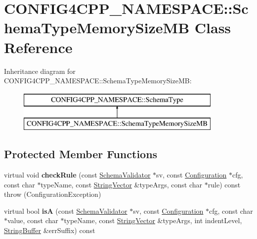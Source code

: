 \hypertarget{classCONFIG4CPP__NAMESPACE_1_1SchemaTypeMemorySizeMB}{\section{C\-O\-N\-F\-I\-G4\-C\-P\-P\-\_\-\-N\-A\-M\-E\-S\-P\-A\-C\-E\-:\-:Schema\-Type\-Memory\-Size\-M\-B Class Reference}
\label{classCONFIG4CPP__NAMESPACE_1_1SchemaTypeMemorySizeMB}
}
Inheritance diagram for C\-O\-N\-F\-I\-G4\-C\-P\-P\-\_\-\-N\-A\-M\-E\-S\-P\-A\-C\-E\-:\-:Schema\-Type\-Memory\-Size\-M\-B\-:\begin{figure}[H]
\begin{center}
\leavevmode
\includegraphics[height=2.000000cm]{classCONFIG4CPP__NAMESPACE_1_1SchemaTypeMemorySizeMB}
\end{center}
\end{figure}
\subsection*{Protected Member Functions}
\begin{DoxyCompactItemize}
\item 
\hypertarget{classCONFIG4CPP__NAMESPACE_1_1SchemaTypeMemorySizeMB_a6f12e23752f296eada46b10ca2ce85d4}{virtual void {\bfseries check\-Rule} (const \hyperlink{classCONFIG4CPP__NAMESPACE_1_1SchemaValidator}{Schema\-Validator} $\ast$sv, const \hyperlink{classCONFIG4CPP__NAMESPACE_1_1Configuration}{Configuration} $\ast$cfg, const char $\ast$type\-Name, const \hyperlink{classCONFIG4CPP__NAMESPACE_1_1StringVector}{String\-Vector} \&type\-Args, const char $\ast$rule) const   throw (\-Configuration\-Exception)}\label{classCONFIG4CPP__NAMESPACE_1_1SchemaTypeMemorySizeMB_a6f12e23752f296eada46b10ca2ce85d4}

\item 
\hypertarget{classCONFIG4CPP__NAMESPACE_1_1SchemaTypeMemorySizeMB_a24e23bc42485480c549bc554f1b40ecf}{virtual bool {\bfseries is\-A} (const \hyperlink{classCONFIG4CPP__NAMESPACE_1_1SchemaValidator}{Schema\-Validator} $\ast$sv, const \hyperlink{classCONFIG4CPP__NAMESPACE_1_1Configuration}{Configuration} $\ast$cfg, const char $\ast$value, const char $\ast$type\-Name, const \hyperlink{classCONFIG4CPP__NAMESPACE_1_1StringVector}{String\-Vector} \&type\-Args, int indent\-Level, \hyperlink{classCONFIG4CPP__NAMESPACE_1_1StringBuffer}{String\-Buffer} \&err\-Suffix) const }\label{classCONFIG4CPP__NAMESPACE_1_1SchemaTypeMemorySizeMB_a24e23bc42485480c549bc554f1b40ecf}

\end{DoxyCompactItemize}

